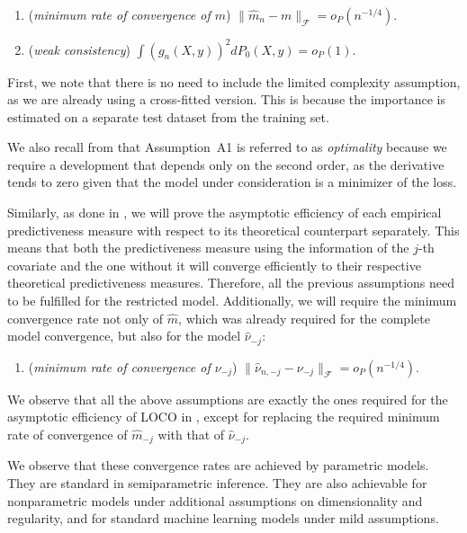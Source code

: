 \documentclass{article}
\theoremstyle{plain}
\theoremstyle{definition}
\theoremstyle{remark}
\begin{document}
\begin{enumerate}[label=B\arabic*]
    \item (\textit{minimum rate of convergence of $m$}) $\|\widehat{m}_n-m\|_\mathcal{F}=o_P(n^{-1/4})$.
    \item (\textit{weak consistency}) $\int (g_n(X,y))^2dP_0(X,y)=o_P(1)$.
\end{enumerate}

First, we note that there is no need to include the limited complexity assumption, as we are already using a cross-fitted version. This is because the importance is estimated on a separate test dataset from the training set.  

We also recall from \citet{williamson2023general} that Assumption~A1 is referred to as \emph{optimality} because we require a development that depends only on the second order, as the derivative tends to zero given that the model under consideration is a minimizer of the loss.

Similarly, as done in \citet{williamson2023general}, we will prove the asymptotic efficiency of each empirical predictiveness measure with respect to its theoretical counterpart separately. This means that both the predictiveness measure using the information of the $j$-th covariate and the one without it will converge efficiently to their respective theoretical predictiveness measures. Therefore, all the previous assumptions need to be fulfilled for the restricted model. Additionally, we will require the minimum convergence rate not only of $\widehat{m}$, which was already required for the complete model convergence, but also for the model $\widehat{\nu}_{-j}$:


\begin{enumerate}[label=B3]
    \item (\textit{minimum rate of convergence of $\nu_{-j}$}) $\|\widehat{\nu}_{n,-j}-\nu_{-j}\|_\mathcal{F}=o_P(n^{-1/4})$.
\end{enumerate}

We observe that all the above assumptions are exactly the ones required for the asymptotic efficiency of LOCO in \citet{williamson2023general}, except for replacing the required minimum rate of convergence of $\widehat{m}_{-j}$ with that of $\widehat{\nu}_{-j}$. 

We observe that these convergence rates are achieved by parametric models. They are standard in semiparametric inference. They are also achievable for nonparametric models under additional assumptions on dimensionality and regularity, and for standard machine learning models under mild assumptions.
\end{document}
